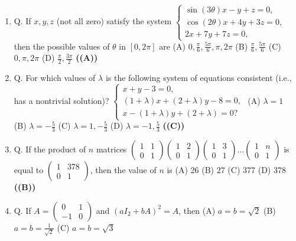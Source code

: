 \documentclass{article}
\begin{document}
\begin{enumerate}
(C) $-(1 + \alpha^3)^2$
(D) $(\alpha - 1)^2 (1 + \alpha + \alpha^2)^2$ \hfill \textbf{((A))}
\item Q. If $x, y, z$ (not all zero) satisfy the system
$\begin{cases} \sin(3\theta) x - y + z = 0, \\ \cos(2\theta) x + 4y + 3z = 0, \\ 2x + 7y + 7z = 0, \end{cases}$
then the possible values of $\theta$ in $[0, 2\pi]$ are
(A) $0, \frac{\pi}{6}, \frac{5\pi}{6}, \pi, 2\pi$
(B) $\frac{\pi}{6}, \frac{5\pi}{6}$
(C) $0, \pi, 2\pi$
(D) $\frac{\pi}{2}, \frac{3\pi}{2}$ \hfill \textbf{((A))}
\item Q. For which values of $\lambda$ is the following system of equations consistent (i.e., has a nontrivial solution)?
$\begin{cases} x+y-3= 0, \\ (1 + \lambda) x + (2 + \lambda) y - 8 = 0, \\ x - (1 + \lambda) y + (2 + \lambda) = 0? \end{cases}$
(A) $\lambda = 1$
(B) $\lambda = - \frac{5}{3}$
(C) $\lambda = 1, - \frac{5}{3}$
(D) $\lambda = -1, \frac{5}{3}$ \hfill \textbf{((C))}
\item Q. If the product of $n$ matrices
$\begin{pmatrix} 1 & 1 \\ 0 & 1 \end{pmatrix} \begin{pmatrix} 1 & 2 \\ 0 & 1 \end{pmatrix} \begin{pmatrix} 1 & 3 \\ 0 & 1 \end{pmatrix} \dots \begin{pmatrix} 1 & n \\ 0 & 1 \end{pmatrix}$
is equal to
$\begin{pmatrix} 1 & 378 \\ 0 & 1 \end{pmatrix}$,
then the value of $n$ is
(A) 26
(B) 27
(C) 377
(D) 378 \hfill \textbf{((B))}
\item Q. If
$A = \begin{pmatrix} 0 & 1 \\ -1 & 0 \end{pmatrix}$
and $(aI_2+bA)^2 = A$,
then
(A) $a = b = \sqrt{2}$
(B) $a = b = \frac{1}{\sqrt{2}}$
(C) $a = b = \sqrt{3}$

\end{enumerate}
\end{document}
